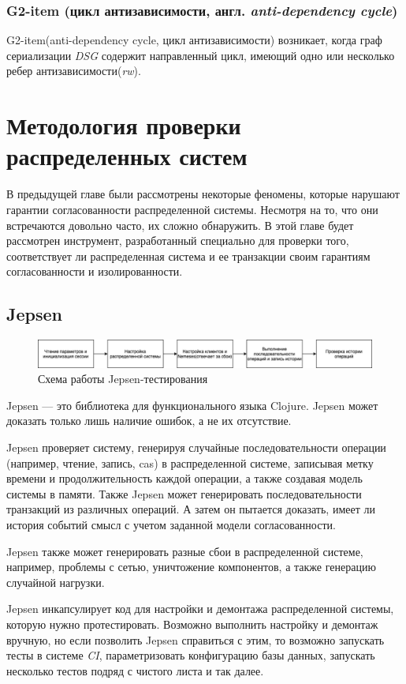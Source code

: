 \documentclass[12pt,  openany]{book}
\begin{document}
\subsection{G2-item (цикл антизависимости, англ. \textit{anti-dependency cycle})}
G2-item(anti-dependency cycle, цикл антизависимости) возникает, когда граф сериализации \textit{DSG} содержит направленный цикл, имеющий одно или несколько ребер антизависимости(\textit{rw}). 

\chapter{Методология проверки распределенных систем}
В предыдущей главе были рассмотрены некоторые феномены, которые нарушают гарантии согласованности распределенной системы. Несмотря на то, что они встречаются довольно часто, их сложно обнаружить.  В этой главе будет рассмотрен инструмент, разработанный специально для проверки того, соответствует ли распределенная система и ее транзакции своим гарантиям согласованности и изолированности.
\section{Jepsen}
\begin{figure}[H]
  \includegraphics[width=\textwidth]{jepsen.jpeg}
  \caption{Схема работы Jepsen-тестирования}
\end{figure}
\par Jepsen --- это библиотека для функционального языка Clojure. Jepsen может доказать только лишь наличие ошибок, а не их отсутствие.

\par Jepsen проверяет систему, генерируя случайные последовательности операции (например, чтение, запись, cas) в распределенной системе, записывая метку времени и продолжительность каждой операции, а также создавая модель системы в памяти.  Также Jepsen может генерировать последовательности транзакций из различных операций. А затем он пытается доказать, имеет ли история событий смысл с учетом заданной модели согласованности.
\par Jepsen также может генерировать разные сбои в распределенной системе, например, проблемы с сетью, уничтожение компонентов, а также генерацию случайной нагрузки.
\par Jepsen инкапсулирует код для настройки и демонтажа распределенной системы, которую нужно протестировать. Возможно выполнить настройку и демонтаж вручную, но если позволить Jepsen справиться с этим, то возможно запускать тесты в системе \textit{CI}, параметризовать конфигурацию базы данных, запускать несколько тестов подряд с чистого листа и так далее.
\end{document}
